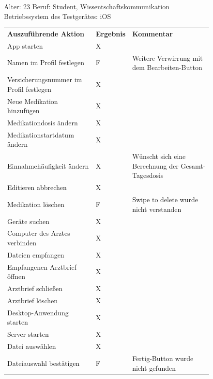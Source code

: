 \documentclass[a4paper]{scrreprt}
\begin{document}
 \begin{figure}
 
  Alter: 23 \newline
Beruf: Student, Wissentschaftskommunikation \newline
Betriebssystem des Testgerätes: iOS \newline \newline
 \begin{tabular}{ |l|l| p{6cm} }
  \textbf{Auszuführende Aktion} & \textbf{Ergebnis} & \textbf{Kommentar} \\
App starten & X & \\
Namen im Profil festlegen & F & Weitere Verwirrung mit dem Bearbeiten-Button \\
Versicherungsnummer im Profil festlegen & X & \\
Neue Medikation hinzufügen & X & \\
Medikationdosis ändern & X & \\
Medikationstartdatum ändern & X & \\
Einnahmehäufigkeit ändern & X & Wünscht sich eine Berechnung der Gesamt-Tagesdosis \\
Editieren abbrechen & X & \\
Medikation löschen & F & Swipe to delete wurde nicht verstanden\\
Geräte suchen & X & \\
Computer des Arztes verbinden & X & \\
Dateien empfangen & X & \\Empfangenen Arztbrief öffnen & X & \\Arztbrief schließen & X & \\Arztbrief löschen & X & \\Desktop-Anwendung starten & X & \\Server starten & X & \\Datei auswählen & X & \\
Dateiauswahl bestätigen & F & Fertig-Button wurde nicht gefunden \\
\end{tabular}
 \newline
 \newline
 \newline
 \end{figure}
\end{document}
